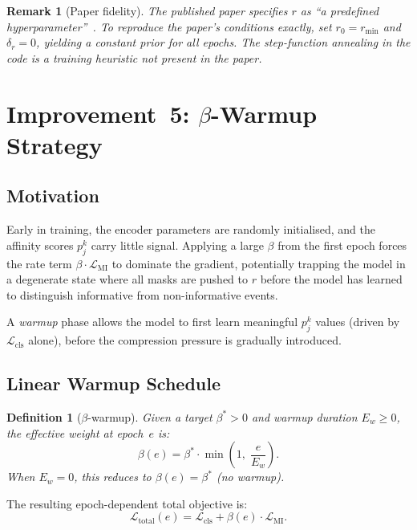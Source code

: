 \documentclass[11pt,a4paper]{article}
\newtheorem{remark}{Remark}
\newtheorem{definition}{Definition}
\newcommand{\loss}{\mathcal{L}}
\begin{document}
\begin{remark}[Paper fidelity]
The published paper specifies $r$ as ``a predefined
hyperparameter''~\cite{seo2024tgib}. To reproduce the paper's
conditions exactly, set $r_0 = r_{\min}$ and $\delta_r = 0$, yielding
a constant prior for all epochs. The step-function annealing in the
code is a training heuristic not present in the paper.
\end{remark}

\section{Improvement~5: $\beta$-Warmup Strategy}
\label{sec:beta_warmup}

\subsection{Motivation}

Early in training, the encoder parameters are randomly initialised, and
the affinity scores $p_j^k$ carry little signal. Applying a large
$\beta$ from the first epoch forces the rate term
$\beta \cdot \loss_{\text{MI}}$ to dominate the gradient, potentially
trapping the model in a degenerate state where all masks are pushed to
$r$ before the model has learned to distinguish informative from
non-informative events.

A \emph{warmup} phase allows the model to first learn meaningful
$p_j^k$ values (driven by $\loss_{\text{cls}}$ alone), before the
compression pressure is gradually introduced.

\subsection{Linear Warmup Schedule}

\begin{definition}[$\beta$-warmup]
\label{def:beta_warmup}
Given a target $\beta^* > 0$ and warmup duration $E_w \geq 0$, the
effective weight at epoch~$e$ is:
\begin{equation}
\label{eq:beta_warmup}
\beta(e) = \beta^* \cdot \min\!\left(
  1,\; \frac{e}{E_w}
\right).
\end{equation}
When $E_w = 0$, this reduces to $\beta(e) = \beta^*$ (no warmup).
\end{definition}

The resulting epoch-dependent total objective is:
\begin{equation}
\label{eq:total_warmup}
\loss_{\text{total}}(e) = \loss_{\text{cls}} + \beta(e) \cdot \loss_{\text{MI}}.
\end{equation}
\end{document}
